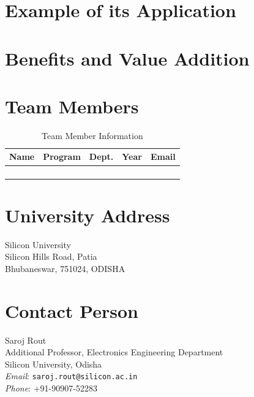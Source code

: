 \documentclass[12pt,twoside]{article}
\begin{document}
\section{Example of its Application}


\section{Benefits and Value Addition}




\section{Team Members}
\begin{table}[h]
    \centering
    \begin{tabular}{|c|c|c|c|c|}
        \hline
        \textbf{Name} & \textbf{Program} & \textbf{Dept.} & \textbf{Year} & \textbf{Email} \\ \hline\hline
        & & & & \\ \hline
        & & & & \\ \hline
        & & & & \\ \hline
        & & & & \\ \hline
    \end{tabular}
    \caption{Team Member Information}
    \label{tab:student_info}
\end{table}

\section{University Address}
Silicon University \\
Silicon Hills Road, Patia \\
Bhubaneswar, 751024, ODISHA

\section{Contact Person}

Saroj Rout \\
Additional Professor, Electronics Engineering Department \\
Silicon University, Odisha \\
\textit{Email}: \texttt{saroj.rout@silicon.ac.in} \\
\textit{Phone}: +91-90907-52283 \\




\end{document}
